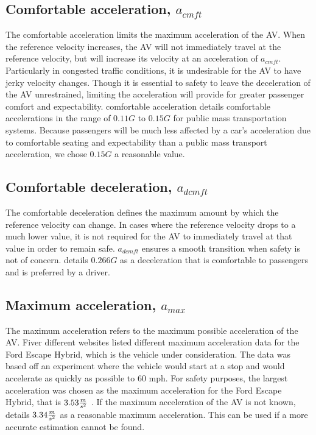 \documentclass[conference]{IEEEtran}
\begin{document}
\subsection{Comfortable acceleration, $a_{cmft}$}
The comfortable acceleration limits the maximum acceleration of the AV. When the reference velocity increases, the AV will not immediately travel at the reference velocity, but will increase its velocity at an acceleration of $a_{cmft}$. Particularly in congested traffic conditions, it is undesirable for the AV to have jerky velocity changes. Though it is essential to safety to leave the deceleration of the AV unrestrained, limiting the acceleration will provide for greater passenger comfort and expectability. {comfortable acceleration} details comfortable accelerations in the range of $0.11G$ to $0.15G$ for public mass transportation systems. Because passengers will be much less affected by a car's acceleration due to comfortable seating and expectability than a public mass transport acceleration, we chose $0.15G$ a reasonable value.

\subsection{Comfortable deceleration, $a_{dcmft}$}
The comfortable deceleration defines the maximum amount by which the reference velocity can change. In cases where the reference velocity drops to a much lower value, it is not required for the AV to immediately travel at that value in order to remain safe. $a_{dcmft}$ ensures a smooth transition when safety is not of concern. \cite{hoberock1977survey} details $0.266G$ as a deceleration that is comfortable to passengers and is preferred by a driver.

\subsection{Maximum acceleration, $a_{max}$}
The maximum acceleration refers to the maximum possible acceleration of the AV. Fiver different websites \cite{carsort,motortrend,caranddriver,edmunds,michigan} listed different maximum acceleration data for the Ford Escape Hybrid, which is the vehicle under consideration. The data was based off an experiment where the vehicle would start at a stop and would accelerate as quickly as possible to 60 mph. For safety purposes, the largest acceleration was chosen as the maximum acceleration for the Ford Escape Hybrid, that is $3.53 {m\over s^2}$ \cite{motortrend}. If the maximum acceleration of the AV is not known, \cite{hoberock1977survey} details $3.34 {m\over s^2}$ as a reasonable maximum acceleration. This can be used if a more accurate estimation cannot be found.
\end{document}
